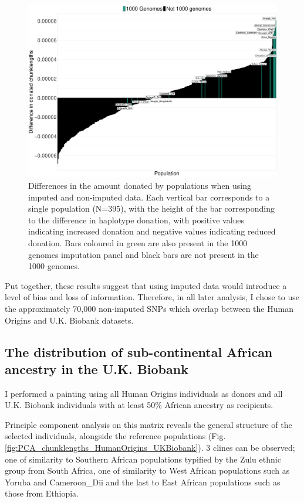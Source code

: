 \begin{figure}
	    \centering
	    \includegraphics[width=1.0\textwidth]{../images/chapter3/imputed_excess_copying_pops.pdf}
	    \caption{Differences in the amount donated by populations when using imputed and non-imputed data. Each vertical bar corresponds to a single population (N=395), with the height of the bar corresponding to the difference in haplotype donation, with positive values indicating increased donation and negative values indicating reduced donation. Bars coloured in green are also present in the 1000 genomes imputation panel and black bars are not present in the 1000 genomes.}
	    \label{fig:imputed_excess_copying_pops}
\end{figure}

Put together, these results suggest that using imputed data would introduce a level of bias and loss of information. Therefore, in all later analysis, I chose to use the approximately 70,000 non-imputed SNPs which overlap between the Human Origins and U.K. Biobank datasets. 

\subsection{The distribution of sub-continental African ancestry in the U.K. Biobank}

I performed a painting using all Human Origins individuals as donors and all U.K. Biobank individuals with at least 50\% African ancestry as recipients. 

Principle component analysis on this matrix reveals the general structure of the selected individuals, alongside the reference populations (Fig. \ref{fig:PCA_chunklengths_HumanOrigins_UKBiobank}). 3 clines can be observed; one of similarity to Southern African populations typified by the Zulu ethnic group from South Africa, one of similarity to West African populations such as Yoruba and Cameroon\_Dii and the last to East African populations such as those from Ethiopia. 

